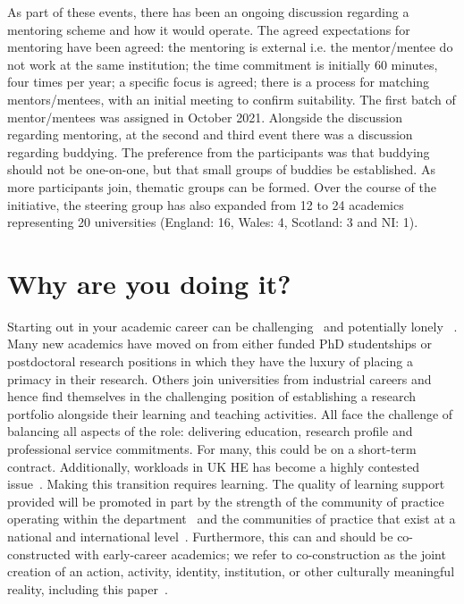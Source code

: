 \documentclass[sigconf]{acmart}
\begin{document}
As part of these events, there has been an ongoing discussion
regarding a mentoring scheme and how it would operate. The agreed
expectations for mentoring have been agreed: the mentoring is external
i.e. the mentor/mentee do not work at the same institution; the time
commitment is initially 60 minutes, four times per year; a specific
focus is agreed; there is a process for matching mentors/mentees, with
an initial meeting to confirm suitability. The first batch of
mentor/mentees was assigned in October 2021. Alongside the discussion
regarding mentoring, at the second and third event there was a
discussion regarding buddying. The preference from the participants
was that buddying should not be one-on-one, but that small groups of
buddies be established. As more participants join, thematic groups can
be formed. Over the course of the initiative, the steering group has
also expanded from 12 to 24 academics representing 20 universities
(England: 16, Wales: 4, Scotland: 3 and NI: 1).

\vspace{-1em}
\section{Why are you doing it?}
\label{sec:Why}
Starting out in your academic career can be
challenging~\cite{Thomas2015} and potentially lonely
~\cite{Foote2009}. Many new academics have moved on from either funded
PhD studentships or postdoctoral research positions in which they have
the luxury of placing a primacy in their research. Others join
universities from industrial careers and hence find themselves in the
challenging position of establishing a research portfolio alongside
their learning and teaching activities. All face the challenge of
balancing all aspects of the role: delivering education, research
profile and professional service commitments. For many, this could be
on a short-term contract. Additionally, workloads in UK HE has become
a highly contested issue~\cite{UCU2016}. Making this transition
requires learning. The quality of learning support provided will be
promoted in part by the strength of the community of practice
operating within the department~\cite{Bolander2008} and the
communities of practice that exist at a national and international
level~\cite{Thomas2015}. Furthermore, this can and should be
co-constructed with early-career academics; we refer to
co-construction as the joint creation of an action, activity,
identity, institution, or other culturally meaningful reality,
including this paper~\cite{jacoby+ochs:1995}.
\end{document}
